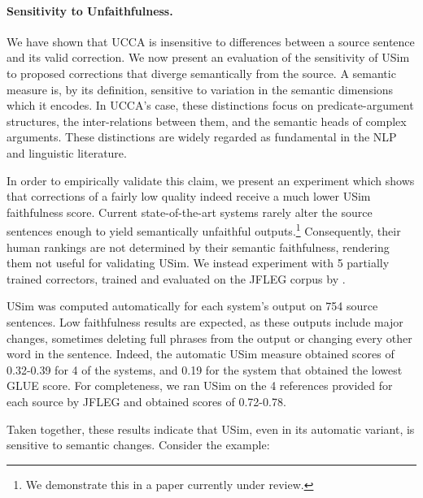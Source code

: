 \documentclass[a4paper, 11pt]{article}
\begin{document}
\vspace{-.3cm}
\paragraph{Sensitivity to Unfaithfulness.}

We have shown that UCCA is insensitive to differences between a source sentence
and its valid correction. We now present an evaluation of the sensitivity of {\sc USim}
to proposed corrections that diverge semantically from the source.
A semantic measure is, by its definition, sensitive to variation in
the semantic dimensions which it encodes. 
In UCCA's case, these distinctions focus on predicate-argument structures,
the inter-relations between them, and the semantic heads of complex arguments.
These distinctions are widely regarded as fundamental in the NLP and linguistic literature.

In order to empirically validate this claim, we present an experiment which shows that corrections
of a fairly low quality indeed receive a much lower USim faithfulness score.
Current state-of-the-art systems rarely alter the source sentences enough to yield semantically unfaithful outputs.\footnote{We demonstrate this in a paper currently under review.}
Consequently, their human rankings are not determined by their semantic faithfulness, rendering them not useful for validating {\sc USim}.
We instead experiment with 5 partially trained correctors, trained and evaluated on the
JFLEG corpus \cite{napoles2017jfleg} by .

{\sc USim} was computed automatically for each system's output on 754 source sentences.
Low faithfulness results are expected, as these outputs include major changes,
sometimes deleting full phrases from the output or changing every other word in the sentence.
Indeed, the automatic USim measure obtained scores of 0.32-0.39 for 4 of the systems, and 0.19
for the system that obtained the lowest GLUE\cite{napoles2015ground} score.
For completeness, we ran {\sc USim} on the 4 references provided for each
source by JFLEG and obtained scores of 0.72-0.78.

Taken together, these results indicate that {\sc USim}, even in its automatic variant,
is sensitive to semantic changes. Consider the example: 
\end{document}
